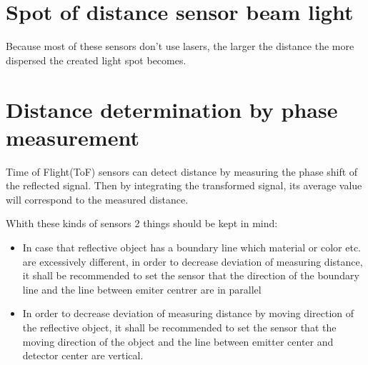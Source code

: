 \section{Spot of distance sensor beam light}
Because most of these sensors don't use lasers, the larger the distance the more dispersed the created light spot becomes.

\section{Distance determination by phase measurement}
Time of Flight(ToF) sensors can detect distance by measuring the phase shift of the reflected signal. Then by integrating the transformed signal, its average value will correspond to the measured distance.

\nt
{
    Whith these kinds of sensors 2 things should be kept in mind:
    \begin{itemize}
        \item In case that reflective object has a boundary line which material or color etc. are excessively different, in order to decrease deviation of measuring distance, it shall be recommended to set the sensor that the direction of the boundary line and the line between emiter centrer are in parallel
        \item In order to decrease deviation of measuring distance by moving direction of the reflective object, it shall be recommended to set the sensor that the moving direction of the object and the line between emitter center and detector center are vertical.
    \end{itemize}

}
